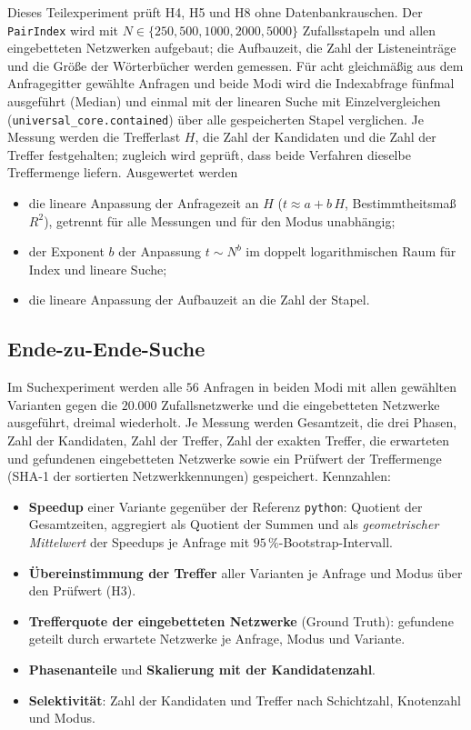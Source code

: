 \documentclass[a4paper,12pt, twoside]{report}
\theoremstyle{definition}
\begin{document}
Dieses Teilexperiment prüft H4, H5 und H8 ohne Datenbankrauschen. Der \texttt{PairIndex} wird mit $N\in\{250,500,1000,2000,5000\}$ Zufallsstapeln und allen eingebetteten Netzwerken aufgebaut; die Aufbauzeit, die Zahl der Listeneinträge und die Größe der Wörterbücher werden gemessen. Für acht gleichmäßig aus dem Anfragegitter gewählte Anfragen und beide Modi wird die Indexabfrage fünfmal ausgeführt (Median) und einmal mit der linearen Suche mit Einzelvergleichen (\texttt{universal\_core.contained}) über alle gespeicherten Stapel verglichen. Je Messung werden die Trefferlast $H$, die Zahl der Kandidaten und die Zahl der Treffer festgehalten; zugleich wird geprüft, dass beide Verfahren dieselbe Treffermenge liefern. Ausgewertet werden
\begin{itemize}
	\item die lineare Anpassung der Anfragezeit an $H$ ($t\approx a+b\,H$, Bestimmtheitsmaß $R^2$), getrennt für alle Messungen und für den Modus unabhängig;
	\item der Exponent $b$ der Anpassung $t\sim N^b$ im doppelt logarithmischen Raum für Index und lineare Suche;
	\item die lineare Anpassung der Aufbauzeit an die Zahl der Stapel.
\end{itemize}

\subsection{Ende-zu-Ende-Suche}
\label{sec:ucx_search}

Im Suchexperiment werden alle $56$ Anfragen in beiden Modi mit allen gewählten Varianten gegen die $20.000$ Zufallsnetzwerke und die eingebetteten Netzwerke ausgeführt, dreimal wiederholt. Je Messung werden Gesamtzeit, die drei Phasen, Zahl der Kandidaten, Zahl der Treffer, Zahl der exakten Treffer, die erwarteten und gefundenen eingebetteten Netzwerke sowie ein Prüfwert der Treffermenge (SHA-1 der sortierten Netzwerkkennungen) gespeichert. Kennzahlen:
\begin{itemize}
	\item \textbf{Speedup} einer Variante gegenüber der Referenz \texttt{python}: Quotient der Gesamtzeiten, aggregiert als Quotient der Summen und als \emph{geometrischer Mittelwert} der Speedups je Anfrage mit $95\,\%$-Bootstrap-Intervall.
	\item \textbf{Übereinstimmung der Treffer} aller Varianten je Anfrage und Modus über den Prüfwert (H3).
	\item \textbf{Trefferquote der eingebetteten Netzwerke} (Ground Truth): gefundene geteilt durch erwartete Netzwerke je Anfrage, Modus und Variante.
	\item \textbf{Phasenanteile} und \textbf{Skalierung mit der Kandidatenzahl}.
	\item \textbf{Selektivität}: Zahl der Kandidaten und Treffer nach Schichtzahl, Knotenzahl und Modus.
\end{itemize}
\end{document}
